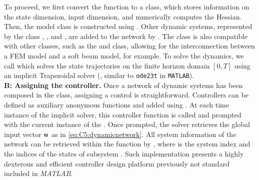 To proceed, we first convert the function to a  class, which stores information on the state dimension, input dimension, and numerically computes the Hessian. Then, the model class is constructed using . Other dynamic systems, represented by the  class , , and , are added to the network by . The  class is also compatible with other classes, such as the  and  class, allowing for the interconnection between a FEM model and a soft beam model, for example.
To solve the dynamics, we call  which solves the state trajectories on the finite horizon domain $[0,T]$ using an implicit Trapezoidal solver (\ie, similar to \texttt{ode23t} in \texttt{MATLAB}). \\

\textbf{B: Assigning the controller.} Once a network of dynamic systems has been composed in the  class, assigning a control is straightforward. Controllers can be defined as auxiliary anonymous functions  and added using . At each time instance of the implicit solver, this controller function is called and prompted with the current instance of the . Once prompted, the solver retrieves the global input vector ${\boldsymbol{u}}$ as in \eqref{eq:C5:dynamicnetwork}. All system information of the network can be retrieved within the function by , where  is the system index and  the indices of the states of subsystem . Such implementation presents a highly dexterous and efficient controller design platform previously not standard included in \textit{MATLAB}. \\
%


